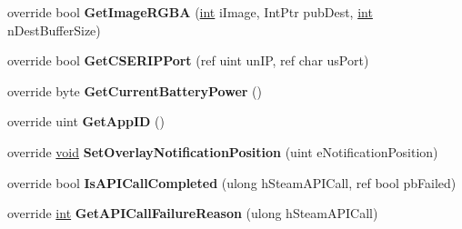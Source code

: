 \begin{DoxyCompactItemize}
\item 
\hypertarget{classValve_1_1Steamworks_1_1CSteamUtils_adce3df0b5dea4617188d56caa9ffa8c1}{}override bool {\bfseries Get\+Image\+R\+G\+B\+A} (\hyperlink{SDL__thread_8h_a6a64f9be4433e4de6e2f2f548cf3c08e}{int} i\+Image, Int\+Ptr pub\+Dest, \hyperlink{SDL__thread_8h_a6a64f9be4433e4de6e2f2f548cf3c08e}{int} n\+Dest\+Buffer\+Size)\label{classValve_1_1Steamworks_1_1CSteamUtils_adce3df0b5dea4617188d56caa9ffa8c1}

\item 
\hypertarget{classValve_1_1Steamworks_1_1CSteamUtils_a44f45a9cc7662e48c70fc897061d5a8f}{}override bool {\bfseries Get\+C\+S\+E\+R\+I\+P\+Port} (ref uint un\+I\+P, ref char us\+Port)\label{classValve_1_1Steamworks_1_1CSteamUtils_a44f45a9cc7662e48c70fc897061d5a8f}

\item 
\hypertarget{classValve_1_1Steamworks_1_1CSteamUtils_aeae3a773b6c4b1cbf2f5b30b33ac9037}{}override byte {\bfseries Get\+Current\+Battery\+Power} ()\label{classValve_1_1Steamworks_1_1CSteamUtils_aeae3a773b6c4b1cbf2f5b30b33ac9037}

\item 
\hypertarget{classValve_1_1Steamworks_1_1CSteamUtils_aaaa36e17fe417f96bf6650cf056db7a2}{}override uint {\bfseries Get\+App\+I\+D} ()\label{classValve_1_1Steamworks_1_1CSteamUtils_aaaa36e17fe417f96bf6650cf056db7a2}

\item 
\hypertarget{classValve_1_1Steamworks_1_1CSteamUtils_a1c8bb808f2719bacf47f8c97b1a102aa}{}override \hyperlink{SDL__audio_8h_a52835ae37c4bb905b903cbaf5d04b05f}{void} {\bfseries Set\+Overlay\+Notification\+Position} (uint e\+Notification\+Position)\label{classValve_1_1Steamworks_1_1CSteamUtils_a1c8bb808f2719bacf47f8c97b1a102aa}

\item 
\hypertarget{classValve_1_1Steamworks_1_1CSteamUtils_ade701040d71504b573acb7a65477113d}{}override bool {\bfseries Is\+A\+P\+I\+Call\+Completed} (ulong h\+Steam\+A\+P\+I\+Call, ref bool pb\+Failed)\label{classValve_1_1Steamworks_1_1CSteamUtils_ade701040d71504b573acb7a65477113d}

\item 
\hypertarget{classValve_1_1Steamworks_1_1CSteamUtils_a3e634d853aa9a13e37368a810eb46049}{}override \hyperlink{SDL__thread_8h_a6a64f9be4433e4de6e2f2f548cf3c08e}{int} {\bfseries Get\+A\+P\+I\+Call\+Failure\+Reason} (ulong h\+Steam\+A\+P\+I\+Call)\label{classValve_1_1Steamworks_1_1CSteamUtils_a3e634d853aa9a13e37368a810eb46049}


\end{DoxyCompactItemize}
